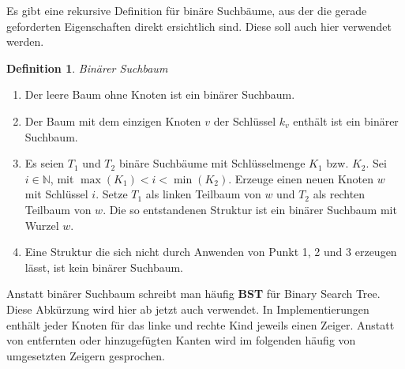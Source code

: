 \documentclass[a4paper,12pt]{article}
\begin{document}
\noindent Es gibt eine rekursive Definition für binäre Suchbäume, aus der die gerade geforderten Eigenschaften direkt ersichtlich sind.
Diese soll auch hier verwendet werden.\\ 


\newtheorem{defi}{Definition}[section]
\begin{defi}Binärer Suchbaum\end{defi}
\begin{enumerate}
	\item Der leere Baum ohne Knoten ist ein binärer Suchbaum.
	\item Der Baum mit dem einzigen Knoten $v$ der Schlüssel $k_v$ enthält ist ein binärer Suchbaum.
	\item Es seien $T_1$ und $T_2$ binäre Suchbäume mit Schlüsselmenge $K_1$ bzw. $K_2$. Sei $i \in \mathbb{N} $, mit $\max{(K_1)} < i < \min{(K_2)}$. Erzeuge einen neuen Knoten $w$ mit Schlüssel $i$. Setze $T_1$ als linken Teilbaum von $w$ und $T_2$ als rechten Teilbaum von $w$. Die so entstandenen Struktur ist ein binärer Suchbaum mit Wurzel $w$. 
	\item Eine Struktur die sich nicht durch Anwenden von Punkt 1, 2 und 3 erzeugen lässt, ist kein binärer Suchbaum.  
\end{enumerate}

\noindent Anstatt binärer Suchbaum schreibt man häufig \textbf{BST} für Binary Search Tree. Diese Abkürzung wird hier ab jetzt auch verwendet. In Implementierungen enthält jeder Knoten für das linke und rechte Kind jeweils einen Zeiger. Anstatt von entfernten oder hinzugefügten Kanten wird im folgenden häufig von umgesetzten Zeigern gesprochen. 	
\end{document}
